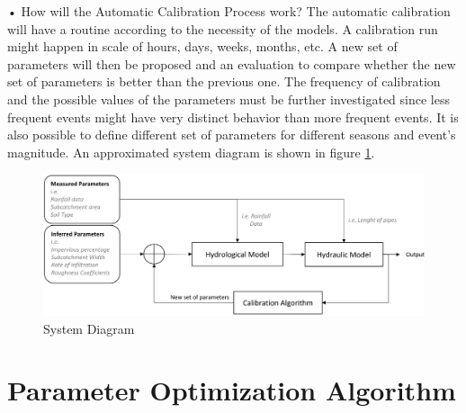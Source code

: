 •	How will the Automatic Calibration Process work? The automatic calibration will have a routine according to the necessity of the models. A calibration run might happen in scale of hours, days, weeks, months, etc. A new set of parameters will then be proposed and an evaluation to compare whether the new set of parameters is better than the previous one. The frequency of calibration and the possible values of the parameters must be further investigated since less frequent events might have very distinct behavior than more frequent events. It is also possible to define different set of parameters for different seasons and event’s magnitude. An approximated system diagram is shown in figure \ref{fig:diagram}.


\begin{figure}[h]
    \centering
	\includegraphics[scale=0.35]{figures/System_Diagram.png}
	\caption{System Diagram}
	\label{fig:diagram}
\end{figure}


\section{Parameter Optimization Algorithm}

